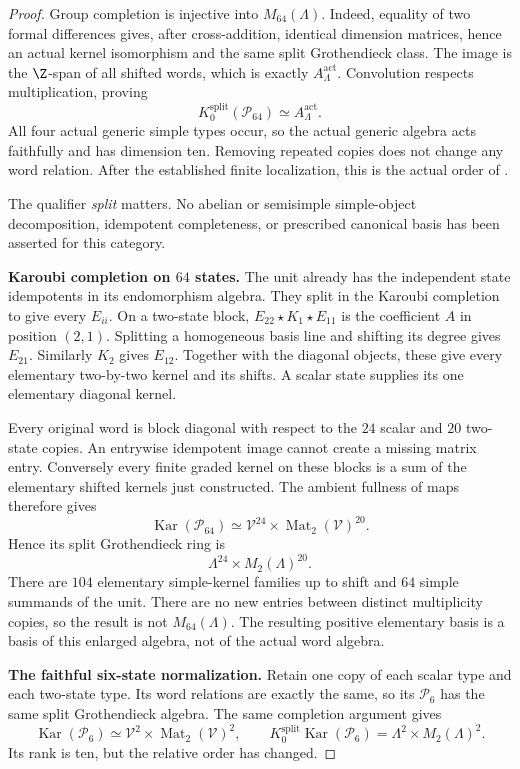 \begin{proof}
Group completion is injective into $M_{64}(\Lambda)$.
Indeed, equality of two formal differences gives,
after cross-addition, identical dimension matrices,
hence an actual kernel isomorphism and the same
split Grothendieck class.
The image is the $\Z$-span of all shifted words,
which is exactly $A_\Lambda^{\mathrm{act}}$.
Convolution respects multiplication, proving
\[
 K_0^{\mathrm{split}}(\mathcal P_{64})
          \simeq A_\Lambda^{\mathrm{act}}.
\]
All four actual generic simple types occur, so the
actual generic algebra acts faithfully and has
dimension ten.
Removing repeated copies does not change any word
relation. After the established finite localization,
this is the actual order of .

The qualifier \emph{split} matters.
No abelian or semisimple simple-object decomposition,
idempotent completeness, or prescribed canonical basis
has been asserted for this category.

\par\smallskip\noindent\textbf{Karoubi completion on $64$ states.}\quad
The unit already has the independent state idempotents
in its endomorphism algebra.
They split in the Karoubi completion to give every
$E_{ii}$.
On a two-state block,
$E_{22}\star K_1\star E_{11}$ is the coefficient $A$
in position $(2,1)$.
Splitting a homogeneous basis line and shifting its
degree gives $E_{21}$.
Similarly $K_2$ gives $E_{12}$.
Together with the diagonal objects, these give every
elementary two-by-two kernel and its shifts.
A scalar state supplies its one elementary diagonal kernel.

Every original word is block diagonal with respect to
the $24$ scalar and $20$ two-state copies.
An entrywise idempotent image cannot create a missing
matrix entry.
Conversely every finite graded kernel on these blocks
is a sum of the elementary shifted kernels just constructed.
The ambient fullness of maps therefore gives
\[
 \operatorname{Kar}(\mathcal P_{64})
       \simeq\mathcal V^{24}\times
                    \operatorname{Mat}_2(\mathcal V)^{20}.
\]
Hence its split Grothendieck ring is
\[
 \Lambda^{24}\times M_2(\Lambda)^{20}.
\]
There are $104$ elementary simple-kernel families
up to shift and $64$ simple summands of the unit.
There are no new entries between distinct multiplicity
copies, so the result is not $M_{64}(\Lambda)$.
The resulting positive elementary basis is a basis
of this enlarged algebra, not of the actual word algebra.

\par\smallskip\noindent\textbf{The faithful six-state normalization.}\quad
Retain one copy of each scalar type and each two-state type.
Its word relations are exactly the same, so its
$\mathcal P_6$ has the same split Grothendieck algebra.
The same completion argument gives
\[
 \operatorname{Kar}(\mathcal P_6)
   \simeq\mathcal V^2\times\operatorname{Mat}_2(\mathcal V)^2,
 \qquad
 K_0^{\mathrm{split}}\operatorname{Kar}(\mathcal P_6)
   =\Lambda^2\times M_2(\Lambda)^2.
\]
Its rank is ten, but the relative order has changed.


\end{proof}
